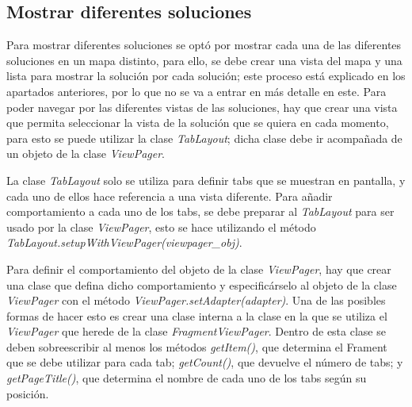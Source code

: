 \subsection{Mostrar diferentes soluciones}
Para mostrar diferentes soluciones se optó por mostrar cada una de las diferentes soluciones en un mapa distinto, para ello, se debe crear una vista del mapa y una lista para mostrar la solución por cada solución; este proceso está explicado en los apartados anteriores, por lo que no se va a entrar en más detalle en este. Para poder navegar por las diferentes vistas de las soluciones, hay que crear una vista que permita seleccionar la vista de la solución que se quiera en cada momento, para esto se puede utilizar la clase \textit{TabLayout}; dicha clase debe ir acompañada de un objeto de la clase \textit{ViewPager}.\newline

La clase \textit{TabLayout} solo se utiliza para definir tabs  que se muestran en pantalla, y cada uno de ellos hace referencia a una vista diferente. Para añadir comportamiento a cada uno de los tabs, se debe preparar al \textit{TabLayout} para ser usado por la clase \textit{ViewPager}, esto se hace utilizando el método \textit{TabLayout.setupWithViewPager(viewpager\_obj)}.\newline

Para definir el comportamiento del objeto de la clase \textit{ViewPager}, hay que crear una clase que defina dicho comportamiento y especificárselo al objeto de la clase \textit{ViewPager} con el método \textit{ViewPager.setAdapter(adapter)}. Una de las posibles formas de hacer esto es crear una clase interna a la clase en la que se utiliza el \textit{ViewPager} que herede de la clase \textit{FragmentViewPager}. Dentro de esta clase se deben sobreescribir al menos los métodos \textit{getItem()}, que determina el Frament que se debe utilizar para cada tab; \textit{getCount()}, que devuelve el número de tabs; y \textit{getPageTitle()}, que determina el nombre de cada uno de los tabs según su posición. \newline

